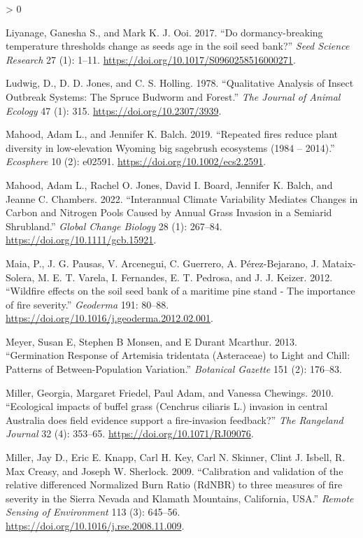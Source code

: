 \documentclass[
  12pt,
]{article}
\newlength{\cslhangindent}
\newenvironment{CSLReferences}[2] %
 {%
  \setlength{\parindent}{0pt}
  \ifodd #1 \everypar{\setlength{\hangindent}{\cslhangindent}}\ignorespaces\fi
  \ifnum #2 > 0
  \setlength{\parskip}{#2\baselineskip}
  \fi
 }%
 {}
\begin{document}
\begin{CSLReferences}{1}{0}
\leavevmode\hypertarget{ref-Liyanage2017}{}%
Liyanage, Ganesha S., and Mark K. J. Ooi. 2017. {``{Do dormancy-breaking
temperature thresholds change as seeds age in the soil seed bank?}''}
\emph{Seed Science Research} 27 (1): 1--11.
\url{https://doi.org/10.1017/S0960258516000271}.

\leavevmode\hypertarget{ref-Ludwig1978}{}%
Ludwig, D., D. D. Jones, and C. S. Holling. 1978. {``Qualitative
{Analysis} of {Insect} {Outbreak} {Systems}: {The} {Spruce} {Budworm}
and {Forest}.''} \emph{The Journal of Animal Ecology} 47 (1): 315.
\url{https://doi.org/10.2307/3939}.

\leavevmode\hypertarget{ref-Mahood2019}{}%
Mahood, Adam L., and Jennifer K. Balch. 2019. {``{Repeated fires reduce
plant diversity in low-elevation Wyoming big sagebrush ecosystems (1984
-- 2014)}.''} \emph{Ecosphere} 10 (2): e02591.
\url{https://doi.org/10.1002/ecs2.2591}.

\leavevmode\hypertarget{ref-Mahood2021}{}%
Mahood, Adam L., Rachel O. Jones, David I. Board, Jennifer K. Balch, and
Jeanne C. Chambers. 2022. {``Interannual Climate Variability Mediates
Changes in Carbon and Nitrogen Pools Caused by Annual Grass Invasion in
a Semiarid Shrubland.''} \emph{Global Change Biology} 28 (1): 267--84.
\url{https://doi.org/10.1111/gcb.15921}.

\leavevmode\hypertarget{ref-Maia2012}{}%
Maia, P., J. G. Pausas, V. Arcenegui, C. Guerrero, A. Pérez-Bejarano, J.
Mataix-Solera, M. E. T. Varela, I. Fernandes, E. T. Pedrosa, and J. J.
Keizer. 2012. {``{Wildfire effects on the soil seed bank of a maritime
pine stand - The importance of fire severity}.''} \emph{Geoderma} 191:
80--88. \url{https://doi.org/10.1016/j.geoderma.2012.02.001}.

\leavevmode\hypertarget{ref-Meyer2013}{}%
Meyer, Susan E, Stephen B Monsen, and E Durant Mcarthur. 2013.
{``{Germination Response of Artemisia tridentata (Asteraceae) to Light
and Chill: Patterns of Between-Population Variation}.''} \emph{Botanical
Gazette} 151 (2): 176--83.

\leavevmode\hypertarget{ref-Miller2010}{}%
Miller, Georgia, Margaret Friedel, Paul Adam, and Vanessa Chewings.
2010. {``{Ecological impacts of buffel grass (Cenchrus ciliaris L.)
invasion in central Australia does field evidence support a
fire-invasion feedback?}''} \emph{The Rangeland Journal} 32 (4):
353--65. \url{https://doi.org/10.1071/RJ09076}.

\leavevmode\hypertarget{ref-Miller2009}{}%
Miller, Jay D., Eric E. Knapp, Carl H. Key, Carl N. Skinner, Clint J.
Isbell, R. Max Creasy, and Joseph W. Sherlock. 2009. {``{Calibration and
validation of the relative differenced Normalized Burn Ratio (RdNBR) to
three measures of fire severity in the Sierra Nevada and Klamath
Mountains, California, USA}.''} \emph{Remote Sensing of Environment} 113
(3): 645--56. \url{https://doi.org/10.1016/j.rse.2008.11.009}.


\end{CSLReferences}
\end{document}
